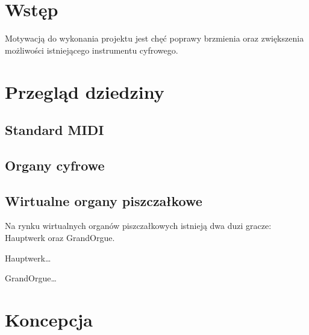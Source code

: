 \documentclass[11pt]{report}
\begin{document}
    \begin{titlepage}
        \centering
        \vspace{0.05\textheight}
        \vspace{0.06\textheight}
        \vspace{0.5\textheight}
        \vspace{0.03\textheight}
    \end{titlepage}

    \tableofcontents


    \chapter{Wstęp}\label{ch:wstęp}
    Motywacją do wykonania projektu jest chęć poprawy brzmienia oraz zwiększenia możliwości istniejącego instrumentu cyfrowego.


    \chapter{Przegląd dziedziny}


    \section{Standard MIDI}


    \section{Organy cyfrowe}


    \section{Wirtualne organy piszczałkowe}
    Na rynku wirtualnych organów piszczałkowych istnieją dwa duzi gracze: Hauptwerk oraz GrandOrgue.

    Hauptwerk\ldots

    GrandOrgue\ldots


    \chapter{Koncepcja}
\end{document}
